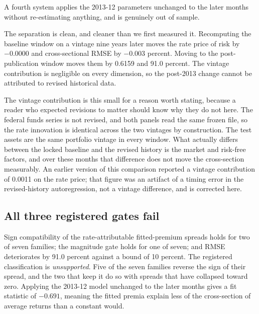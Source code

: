 \documentclass[11pt]{article}
\begin{document}
A fourth system applies the 2013-12 parameters unchanged to the %
later months without re-estimating anything, and is genuinely out of sample.



The separation is clean, and cleaner than we first measured it. Recomputing the
baseline window on a vintage nine years later moves the rate price of risk by
$-0.0000$ and cross-sectional RMSE by $-0.003$ percent. Moving to the %
post-publication window moves them by 0.6159 and 91.0 percent. The vintage %
contribution is negligible on every dimension, so the post-2013 change cannot be %
attributed to revised historical data. %

The vintage contribution is this small for a reason worth stating, because a
reader who expected revisions to matter should know why they do not here. The
federal funds series is not revised, and both panels read the same frozen file,
so the rate innovation is identical across the two vintages by construction. The
test assets are the same portfolio vintage in every window. What actually differs
between the locked baseline and the revised history is the market and risk-free
factors, and over these months that difference does not move the cross-section
measurably. An earlier version of this comparison reported a vintage contribution
of 0.0011 on the rate price; that figure was an artifact of a timing error in the %
revised-history autoregression, not a vintage difference, and is corrected here.

\subsection{All three registered gates fail}

Sign compatibility of the rate-attributable fitted-premium spreads holds for two
of seven families; the magnitude gate holds for one of seven; and RMSE
deteriorates by 91.0 percent against a bound of 10 percent. The registered %
classification is \emph{unsupported}. %
Five of the seven families reverse the sign of their spread, and the two that
keep it do so with spreads that have collapsed toward zero. Applying the 2013-12 %
model unchanged to the later months gives a fit statistic of $-0.691$, meaning %
the fitted premia explain less of the cross-section of average returns than a
constant would. %
\end{document}
